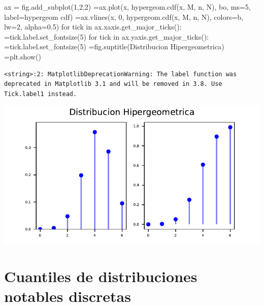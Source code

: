 \documentclass[
  letterpaper,
  DIV=11,
  numbers=noendperiod]{scrreprt}
\newenvironment{Shaded}{\begin{snugshade}}{\end{snugshade}}
\newcommand{\ControlFlowTok}[1]{\textcolor[rgb]{0.00,0.23,0.31}{#1}}
\newcommand{\DecValTok}[1]{\textcolor[rgb]{0.68,0.00,0.00}{#1}}
\newcommand{\FloatTok}[1]{\textcolor[rgb]{0.68,0.00,0.00}{#1}}
\newcommand{\KeywordTok}[1]{\textcolor[rgb]{0.00,0.23,0.31}{#1}}
\newcommand{\NormalTok}[1]{\textcolor[rgb]{0.00,0.23,0.31}{#1}}
\newcommand{\OperatorTok}[1]{\textcolor[rgb]{0.37,0.37,0.37}{#1}}
\newcommand{\StringTok}[1]{\textcolor[rgb]{0.13,0.47,0.30}{#1}}
\begin{document}
\begin{Shaded}
\begin{Highlighting}[]
\NormalTok{ax }\OperatorTok{=}\NormalTok{ fig.add\_subplot(}\DecValTok{1}\NormalTok{,}\DecValTok{2}\NormalTok{,}\DecValTok{2}\NormalTok{)}
 \OperatorTok{=}\NormalTok{ax.plot(x, hypergeom.cdf(x, M, n, N), }\StringTok{\textquotesingle{}bo\textquotesingle{}}\NormalTok{, ms}\OperatorTok{=}\DecValTok{5}\NormalTok{, label}\OperatorTok{=}\StringTok{\textquotesingle{}hypergeom cdf\textquotesingle{}}\NormalTok{)}
 \OperatorTok{=}\NormalTok{ax.vlines(x, }\DecValTok{0}\NormalTok{, hypergeom.cdf(x, M, n, N), colors}\OperatorTok{=}\StringTok{\textquotesingle{}b\textquotesingle{}}\NormalTok{, lw}\OperatorTok{=}\DecValTok{2}\NormalTok{, alpha}\OperatorTok{=}\FloatTok{0.5}\NormalTok{)}
\ControlFlowTok{for}\NormalTok{ tick }\KeywordTok{in}\NormalTok{ ax.xaxis.get\_major\_ticks():}
   \OperatorTok{=}\NormalTok{tick.label.set\_fontsize(}\DecValTok{5}\NormalTok{)}
\ControlFlowTok{for}\NormalTok{ tick }\KeywordTok{in}\NormalTok{ ax.yaxis.get\_major\_ticks():}
   \OperatorTok{=}\NormalTok{tick.label.set\_fontsize(}\DecValTok{5}\NormalTok{)}
 \OperatorTok{=}\NormalTok{fig.suptitle(}\StringTok{\textquotesingle{}Distribucion Hipergeometrica\textquotesingle{}}\NormalTok{)}
 \OperatorTok{=}\NormalTok{plt.show()}
\end{Highlighting}
\end{Shaded}

\begin{verbatim}
<string>:2: MatplotlibDeprecationWarning: The label function was deprecated in Matplotlib 3.1 and will be removed in 3.8. Use Tick.label1 instead.
\end{verbatim}

\includegraphics{3_files/figure-pdf/py_hyper2-1.pdf}

\hypertarget{cuantiles-de-distribuciones-notables-discretas}{%
\section{Cuantiles de distribuciones notables
discretas}\label{cuantiles-de-distribuciones-notables-discretas}}
\end{document}
